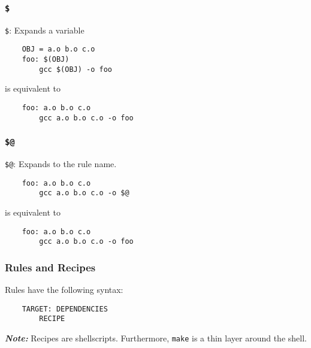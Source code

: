\documentclass[13pt]{article}
\begin{document}
\subsubsection*{\texttt{\$}}
\texttt{\$}: Expands a variable
\begin{verbatim}
    OBJ = a.o b.o c.o
    foo: $(OBJ)
        gcc $(OBJ) -o foo
\end{verbatim}
is equivalent to 
\begin{verbatim}
    foo: a.o b.o c.o
        gcc a.o b.o c.o -o foo
\end{verbatim}

\subsubsection*{\texttt{\$@}}
\texttt{\$@}: Expands to the rule name.
\begin{verbatim}
    foo: a.o b.o c.o
        gcc a.o b.o c.o -o $@
\end{verbatim}
is equivalent to 
\begin{verbatim}
    foo: a.o b.o c.o
        gcc a.o b.o c.o -o foo
\end{verbatim}

\subsubsection*{Rules and Recipes}
Rules have the following syntax:
\begin{verbatim}
    TARGET: DEPENDENCIES
        RECIPE
\end{verbatim}
\textit{\textbf{Note:}} Recipes are shellscripts. Furthermore, \texttt{make} is a thin layer around the shell.





\end{document}
